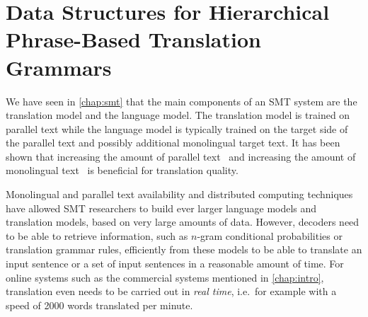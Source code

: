 \chapter{Data Structures for Hierarchical Phrase-Based Translation Grammars}
\label{chap:hfile}


We have seen in \autoref{chap:smt} that the main components of an SMT
system are the translation model and the language model. The translation
model is trained on parallel text while the language model is typically
trained on the target side of the parallel text and possibly additional
monolingual target text. It has been shown that increasing the amount
of parallel
text~\citep{pino-iglesias-degispert-blackwood-brunning-byrne:2010:WMT}
and increasing the amount of monolingual
text~\citep{brants-popat-xu-och-dean:2007:EMNLP-CoNLL}
is beneficial for translation quality.

Monolingual and parallel text availability and distributed computing techniques
have allowed SMT
researchers to build ever larger language models and
translation models, based on very large amounts of data.
However, decoders need to be
able to retrieve information, such as $n$-gram conditional
probabilities or translation grammar rules, efficiently from these models to be able to
translate an input sentence or a set of input sentences in a reasonable amount
of time. For online systems such as the commercial systems
mentioned in \autoref{chap:intro}, translation even needs to be carried out in %
\emph{real time}, i.e.\ for example with a speed of 2000 words translated per minute.

